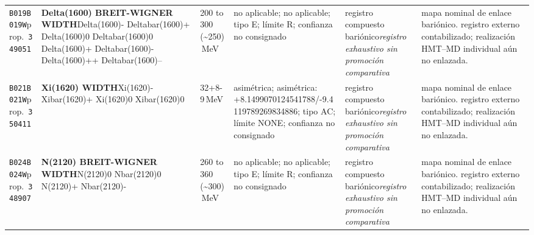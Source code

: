 \begin{landscape}
\begin{longtable}{L{1.85cm}L{4.45cm}L{2.35cm}L{4.05cm}L{3.35cm}L{7.15cm}}
\texttt{B019}\newline \texttt{B019W}\newline prop.\ \texttt{349051} & \textbf{Delta(1600) BREIT-WIGNER WIDTH}\newline Delta(1600)- \textbar{}\allowbreak{} Deltabar(1600)+ \textbar{}\allowbreak{} Delta(1600)0 \textbar{}\allowbreak{} Deltabar(1600)0 \textbar{}\allowbreak{} Delta(1600)+ \textbar{}\allowbreak{} Deltabar(1600)- \textbar{}\allowbreak{} Delta(1600)++ \textbar{}\allowbreak{} Deltabar(1600)-- & 200 to 300 (\textasciitilde{}250)\,MeV & no aplicable; no aplicable; tipo E; límite R; confianza no consignado & registro compuesto bariónico\newline \emph{registro exhaustivo sin promoción comparativa} & mapa nominal de enlace bariónico. registro externo contabilizado; realización HMT--MD individual aún no enlazada. \\
\texttt{B021}\newline \texttt{B021W}\newline prop.\ \texttt{350411} & \textbf{Xi(1620) WIDTH}\newline Xi(1620)- \textbar{}\allowbreak{} Xibar(1620)+ \textbar{}\allowbreak{} Xi(1620)0 \textbar{}\allowbreak{} Xibar(1620)0 & 32+8-9\,MeV & asimétrica; asimétrica: +8.1499070124541788/-9.4119789269834886; tipo AC; límite NONE; confianza no consignado & registro compuesto bariónico\newline \emph{registro exhaustivo sin promoción comparativa} & mapa nominal de enlace bariónico. registro externo contabilizado; realización HMT--MD individual aún no enlazada. \\
\texttt{B024}\newline \texttt{B024W}\newline prop.\ \texttt{348907} & \textbf{N(2120) BREIT-WIGNER WIDTH}\newline N(2120)0 \textbar{}\allowbreak{} Nbar(2120)0 \textbar{}\allowbreak{} N(2120)+ \textbar{}\allowbreak{} Nbar(2120)- & 260 to 360 (\textasciitilde{}300)\,MeV & no aplicable; no aplicable; tipo E; límite R; confianza no consignado & registro compuesto bariónico\newline \emph{registro exhaustivo sin promoción comparativa} & mapa nominal de enlace bariónico. registro externo contabilizado; realización HMT--MD individual aún no enlazada. \\

\end{longtable}
\end{landscape}
